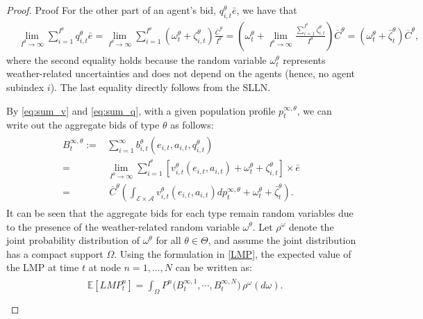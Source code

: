 \documentclass{article}
\theoremstyle{definition}
\theoremstyle{plain}
\begin{document}
\begin{proof}{Proof}
For the other part of an agent's bid,  $q^{\theta}_{i,t}\bar{e}$, we have that 
\begin{align}
& \lim_{I^{\theta}\to \infty}\sum_{i=1}^{I^{\theta}}  q^{\theta}_{i,t}\bar{e} = \lim_{I^{\theta}\to \infty}\sum_{i=1}^{I^{\theta}}\left(\omega_t^{\theta} + \zeta_{i,t}^{\theta}\right)\frac{\overline{C}^{\theta}}{I^{\theta}} = \left(\omega^{\theta}_t + \lim_{I^{\theta}\to \infty}\frac{\sum_{i=1}^{I^{\theta}}\zeta_{i,t}^{\theta}}{I^{\theta}}\right)\overline{C}^{\theta} = 
\left(\omega^{\theta}_t + \bar{\zeta}_{t}^{\theta} \right)\overline{C}^{\theta}, \label{eq:sum_q}
\end{align}
where the second equality holds because the random variable \(\omega_t^{\theta}\) represents weather-related uncertainties and does not depend on the agents (hence, no agent subindex \(i\)). The last equality directly follows from the SLLN.

By \eqref{eq:sum_v} and \eqref{eq:sum_q}, with a given population profile $p_t^{\infty,\theta}$, we can write out the aggregate bids of type $\theta$ as follows: 
\begin{align}\label{eq:agg_bids}
\begin{split}
B^{\infty,\theta}_{t} := & \sum_{i=1}^{\infty}b_{i,t}^{\theta}(e_{i,t},a_{i,t},q^{\theta}_{i,t})  \\
= &  \lim_{I^{\theta}\to \infty}\sum_{i=1}^{I^{\theta}} \left[v^{\theta}_{i,t}(e_{i,t}, a_{i,t}) +\omega_t^{\theta} + \zeta_{i,t}^{\theta}\right] \times   \bar{e} \\
= & \ \overline{C}^{\theta}\left(\int_{\mathcal{E}\times\mathcal{A}} v^{\theta}_{i,t}(e_{i,t},a_{i,t})dp_t^{\infty, \theta} +\omega^{\theta}_t + \bar{\zeta}_{t}^{\theta} \right).
\end{split}
\end{align}
It can be seen that the aggregate bids for each type remain random variables due to the presence of the weather-related random variable \(\omega^{\theta}\). Let \(\rho^{\omega}\) denote the joint probability distribution of \(\omega^{\theta}\) for all \(\theta \in \Theta\), and assume the joint distribution has a compact support \(\Omega\). Using the formulation in \eqref{LMP}, the expected value of the LMP at time \(t\) at node \(n = 1, \ldots, N\) can be written as:
\begin{align}\label{eq:ELMP}
\begin{split}
&\mathbb{E}[LMP^n_t] = \int_{\Omega} P^n\bigg(B^{\infty,1}_{t},\cdots, B^{\infty,N}_{t}\bigg) \, \rho^{\omega}(d\omega).\\
\end{split}
\end{align}


\end{proof}
\end{document}
